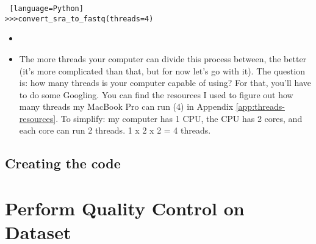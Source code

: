 \begin{enumerate}
            \begin{lstlisting} [language=Python]
>>>convert_sra_to_fastq(threads=4)
            \end{lstlisting}
                \begin{itemize}
                \item {}
                \item The more threads your computer can divide this process between, the better (it's more complicated than that, but for now let's go with it). The question is: how many threads is your computer capable of using? For that, you'll have to do some Googling. You can find the resources I used to figure out how many threads my MacBook Pro can run (4) in Appendix \ref{app:threads-resources}. To simplify: my computer has 1 CPU, the CPU has 2 cores, and each core can run 2 threads. 1 x 2 x 2 = 4 threads.
                \end{itemize}            
                                    
        \end{enumerate}
        
        \subsection{Creating the code}
        
    
    
    \section{Perform Quality Control on Dataset}

